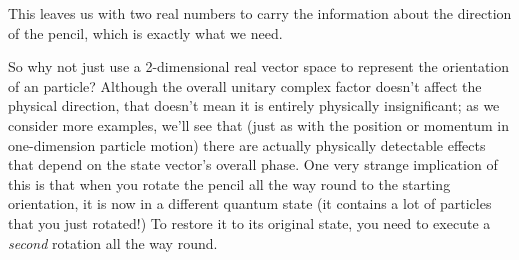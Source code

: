 This leaves us with two real numbers to carry the information about the direction of the pencil, which is exactly what we need.

So why not just use a 2-dimensional real vector space to represent the orientation of an particle? Although the overall unitary complex factor doesn't affect the physical direction, that doesn't mean it is entirely physically insignificant; as we consider more examples, we'll see that (just as with the position or momentum in one-dimension particle motion) there are actually physically detectable effects that depend on the state vector's overall phase. One very strange implication of this is that when you rotate the pencil all the way round to the starting orientation, it is now in a different quantum state (it contains a lot of particles that you just rotated!) To restore it to its original state, you need to execute a \textit{second} rotation all the way round.

